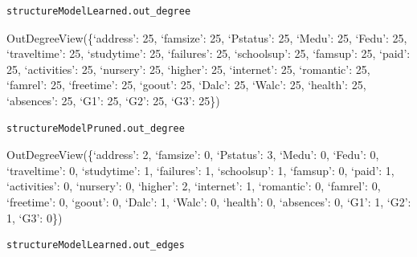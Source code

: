 \documentclass[
]{article}
\begin{document}
\begin{verbatim}
structureModelLearned.out_degree
\end{verbatim}

OutDegreeView(\{`address': 25, `famsize': 25, `Pstatus': 25, `Medu': 25,
`Fedu': 25, `traveltime': 25, `studytime': 25, `failures': 25,
`schoolsup': 25, `famsup': 25, `paid': 25, `activities': 25, `nursery':
25, `higher': 25, `internet': 25, `romantic': 25, `famrel': 25,
`freetime': 25, `goout': 25, `Dalc': 25, `Walc': 25, `health': 25,
`absences': 25, `G1': 25, `G2': 25, `G3': 25\})

\begin{verbatim}
structureModelPruned.out_degree
\end{verbatim}

OutDegreeView(\{`address': 2, `famsize': 0, `Pstatus': 3, `Medu': 0,
`Fedu': 0, `traveltime': 0, `studytime': 1, `failures': 1, `schoolsup':
1, `famsup': 0, `paid': 1, `activities': 0, `nursery': 0, `higher': 2,
`internet': 1, `romantic': 0, `famrel': 0, `freetime': 0, `goout': 0,
`Dalc': 1, `Walc': 0, `health': 0, `absences': 0, `G1': 1, `G2': 1,
`G3': 0\})

\begin{verbatim}
structureModelLearned.out_edges
\end{verbatim}
\end{document}
